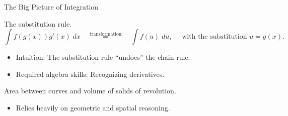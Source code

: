 \documentclass[../main.tex]{subfiles}
\begin{document}
\begin{lesson}{The Big Picture of Integration}
\begin{description}[itemsep=2ex]
    \item[Calculation.] The substitution rule.
      \[
        \int f(g(x))g'(x) \;dx \quad\overset{\text{transformation}}{=}\quad \int f(u) \;du, \quad\text{ with the substitution } u = g(x).
      \]
      \begin{itemize}
        \item Intuition: The substitution rule ``undoes'' the chain rule.
        \item Required algebra skills: Recognizing derivatives.
      \end{itemize}

    \item[Applications.] Area between curves and volume of solids of revolution.
      \begin{itemize}
        \item Relies heavily on geometric and spatial reasoning.
      \end{itemize}
  \end{description}

  \begin{figure}
  \end{figure}
\end{lesson}
\end{document}
